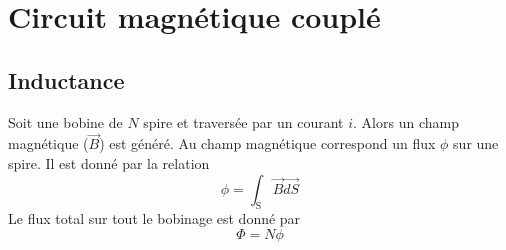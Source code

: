 \chapter{Circuit magnétique couplé}
\section{Inductance}
Soit une bobine de $N$ spire et traversée par un courant $i$. Alors un champ magnétique ($\vec{B}$) est généré. Au champ magnétique correspond un flux $\phi$  sur une spire. Il est donné par la relation
\begin{equation}
\phi=\int_\text{S}{\vec{B}\vec{dS}}
\end{equation}
Le flux total sur tout le bobinage est donné par 
\begin{equation}
\Phi=N\phi
\end{equation}
